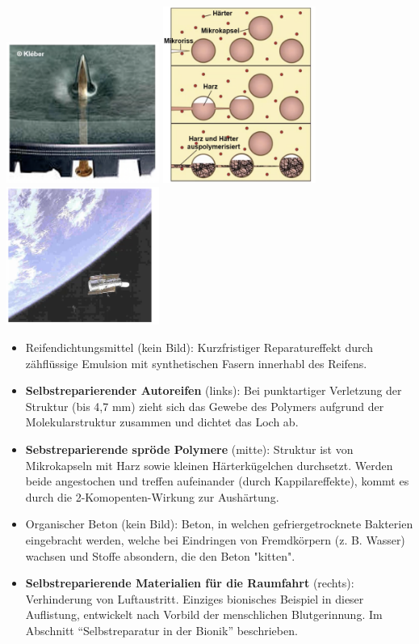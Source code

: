 \begin{center}
    \includegraphics[width=5cm]{lec5/figures/selbstheilung-technik-1.png}
    \includegraphics[width=5cm]{lec5/figures/selbstheilung-technik-3.png}
    \includegraphics[width=5cm]{lec5/figures/selbstheilung-technik-4.png}
\end{center}

\begin{itemize}
    \item Reifendichtungsmittel (kein Bild): Kurzfristiger Reparatureffekt durch zähflüssige Emulsion mit synthetischen Fasern innerhabl des Reifens.
    \item \textbf{Selbstreparierender Autoreifen} (links): Bei punktartiger Verletzung der Struktur (bis 4,7 mm) zieht sich das Gewebe des Polymers aufgrund der Molekularstruktur zusammen und dichtet das Loch ab. 
    \item \textbf{Sebstreparierende spröde Polymere} (mitte): Struktur ist von Mikrokapseln mit Harz sowie kleinen Härterkügelchen durchsetzt. Werden beide angestochen und treffen aufeinander (durch Kappilareffekte), kommt es durch die 2-Komopenten-Wirkung zur Aushärtung.
    \item Organischer Beton (kein Bild): Beton, in welchen gefriergetrocknete Bakterien eingebracht werden, welche bei Eindringen von Fremdkörpern (z. B. Wasser) wachsen und Stoffe absondern, die den Beton "kitten".
    \item \textbf{Selbstreparierende Materialien für die Raumfahrt} (rechts): Verhinderung von Luftaustritt. Einziges bionisches Beispiel in dieser Auflistung, entwickelt nach Vorbild der menschlichen Blutgerinnung. Im Abschnitt ``Selbstreparatur in der Bionik'' beschrieben.
\end{itemize}

